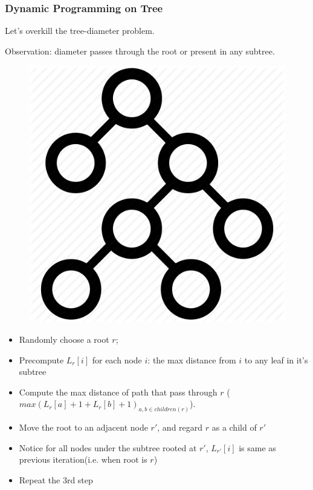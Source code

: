 \documentclass{beamer}
\begin{document}
\begin{frame}
  \frametitle{Dynamic Programming on Tree}
Let's overkill the tree-diameter problem.

Observation: diameter passes through the root or present in any subtree.
\begin{minipage}{.2\textwidth}
\begin{figure}[]
  \includegraphics[width=.9\textwidth]{pics/tree.png}
\end{figure}
\end{minipage}%
\begin{minipage}{.8\textwidth}
 \begin{itemize}
  \footnotesize
  \item<2-> Randomly choose a root $r$;
  \item<3-> Precompute $L_r[i]$ for each node $i$: the max distance from $i$ to any leaf in it's subtree
  \item<4-> Compute the max distance of path that pass through $r$ ($max(L_{r}[a]+1 + L_{r}[b]+1)_{a, b \in children(r)}$).
  \item<5-> Move the root to an adjacent node $r'$, and regard $r$ as a child of $r'$
  \item<6-> Notice for all nodes under the subtree rooted at $r'$,  $L_{r'}[i]$ is same as previous iteration(i.e. when root is $r$)
  \item<7-> Repeat the 3rd step
\end{itemize} 
\end{minipage}

\end{frame}
\end{document}

